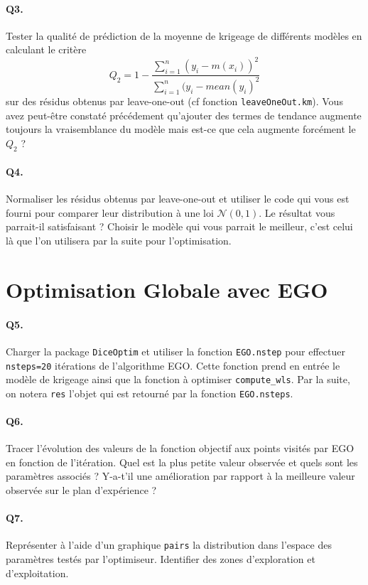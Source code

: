 \documentclass[12pt]{scrartcl}
\begin{document}
\paragraph{Q3. } Tester la qualité de prédiction de la moyenne de krigeage de différents modèles en calculant le critère 
$$Q_2 = 1 - \frac{\sum_{i=1}^n (y_i - m(x_i))^2}{\sum_{i=1}^n (y_i - mean(y_i)^2}$$
sur des résidus obtenus par leave-one-out (cf fonction \texttt{leaveOneOut.km}). Vous avez peut-être constaté précédement qu'ajouter des termes de tendance augmente toujours la vraisemblance du modèle mais est-ce que cela augmente forcément le $Q_2$ ? 

\paragraph{Q4. } Normaliser les résidus obtenus par leave-one-out et utiliser le code qui vous est fourni pour comparer leur distribution à une loi $\mathcal{N}(0, 1)$. Le résultat vous parrait-il satisfaisant ? Choisir le modèle qui vous parrait le meilleur, c'est celui là que l'on utilisera par la suite pour l'optimisation.

\section{Optimisation Globale avec EGO}

\paragraph{Q5. } Charger la package \texttt{DiceOptim} et utiliser la fonction \texttt{EGO.nstep} pour effectuer \texttt{nsteps=20} itérations de l'algorithme EGO. Cette fonction prend en entrée le modèle de krigeage ainsi que la fonction à optimiser \texttt{compute\_wls}. Par la suite, on notera \texttt{res} l'objet qui est retourné par la fonction \texttt{EGO.nsteps}.

\paragraph{Q6. } Tracer l'évolution des valeurs de la fonction objectif aux points visités par EGO en fonction de l'itération. Quel est la plus petite valeur observée et quels sont les paramètres associés ? Y-a-t'il une amélioration par rapport à la meilleure valeur observée sur le plan d'expérience ?

\paragraph{Q7. } Représenter à l'aide d'un graphique \texttt{pairs} la distribution dans l'espace des paramètres testés par l'optimiseur. Identifier des zones d'exploration et d'exploitation.
\end{document}
